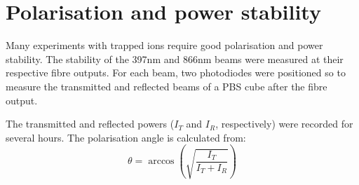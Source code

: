 \section{Polarisation and power stability}
\label{sec:beamstability}

Many experiments with trapped ions require good polarisation and power stability. The stability of the 397nm and 866nm beams were measured at their respective fibre outputs. For each beam, two photodiodes were positioned so to measure the transmitted and reflected beams of a PBS cube after the fibre output. 

The transmitted and reflected powers ($I_T$ and $I_R$, respectively) were recorded for several hours. The polarisation angle is calculated from:
\begin{equation}
\theta = \arccos\left(\sqrt{\frac{I_T}{I_T + I_R}}\right)
\end{equation}

